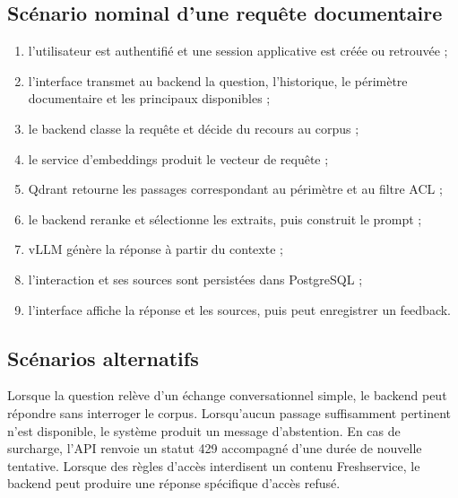 \subsection{Scénario nominal d'une requête documentaire}

\begin{enumerate}
    \item l'utilisateur est authentifié et une session applicative est créée ou retrouvée ;
    \item l'interface transmet au backend la question, l'historique, le périmètre documentaire et les principaux disponibles ;
    \item le backend classe la requête et décide du recours au corpus ;
    \item le service d'embeddings produit le vecteur de requête ;
    \item Qdrant retourne les passages correspondant au périmètre et au filtre ACL ;
    \item le backend reranke et sélectionne les extraits, puis construit le prompt ;
    \item vLLM génère la réponse à partir du contexte ;
    \item l'interaction et ses sources sont persistées dans PostgreSQL ;
    \item l'interface affiche la réponse et les sources, puis peut enregistrer un feedback.
\end{enumerate}

\subsection{Scénarios alternatifs}

Lorsque la question relève d'un échange conversationnel simple, le backend peut répondre sans interroger le corpus. Lorsqu'aucun passage suffisamment pertinent n'est disponible, le système produit un message d'abstention. En cas de surcharge, l'API renvoie un statut 429 accompagné d'une durée de nouvelle tentative. Lorsque des règles d'accès interdisent un contenu Freshservice, le backend peut produire une réponse spécifique d'accès refusé.
